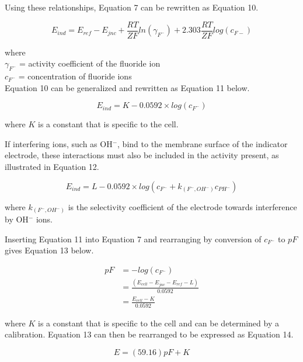 \documentclass{article}
\begin{document}
Using these relationships, Equation 7 can be rewritten as Equation 10.
\begin{center}
    \begin{equation}
        E_{ind} = E_{ref} - E_{jnc} + \frac{RT}{ZF}ln(\gamma_{F^-}) + 2.303 \frac{RT}{ZF}
        log(c_{F-})
    \end{equation}
\end{center}
where \\
$\gamma_{F^-}$ = activity coefficient of the fluoride ion \\
$c_{F^-}$ = concentration of fluoride ions \\ 

Equation 10 can be generalized and rewritten as Equation 11 below.
\begin{center}
    \begin{equation}
        E_{ind} = K - 0.0592\times log(c_{F^-})
    \end{equation}
\end{center}
where $K$ is a constant that is specific to the cell.

If interfering ions, such as OH$^-$, bind to the membrane surface of the
indicator electrode, these interactions must also be included in the activity
present, as illustrated in Equation 12.
\begin{center}
    \begin{equation}
        E_{ind} = L - 0.0592 \times log (c_{F^-} + k_{(F^-,OH^-)}c_{PH^-})
    \end{equation}
\end{center}
where $k_{(F^-,OH^-)}$ is the selectivity coefficient of the electrode towards
interference by OH$^-$ ions. \cite{nmt}

Inserting Equation 11 into Equation 7 and rearranging by conversion of $c_{F^-}$ to $pF$ gives Equation 13 below.
\begin{center}
    \begin{equation}
        \begin{aligned}
        pF &= -log (c_{F^-}) \\
        &= \frac{(E_{cell} - E_{jnc} - E_{ref} - L)}{0.0592} \\
        &= \frac{E_{cell} - K}{0.0592} 
        \end{aligned}
        \end{equation}
\end{center}
where $K$ is a constant that is specific to the cell and can be determined by a
calibration. 
Equation 13 can then be rearranged to be expressed as Equation 14.
\begin{center}
    \begin{equation}
        E = (59.16) pF + K
    \end{equation}
\end{center}
\end{document}
